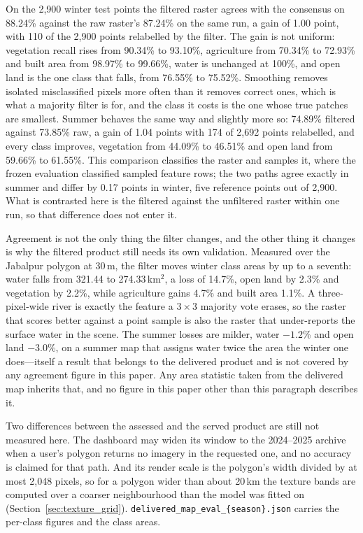 \documentclass[conference]{IEEEtran}
\begin{document}
On the 2{,}900 winter test points the filtered raster agrees with the consensus on 88.24\% against the raw raster's 87.24\% on the same run, a gain of 1.00 point, with 110 of the 2{,}900 points relabelled by the filter. The gain is not uniform: vegetation recall rises from 90.34\% to 93.10\%, agriculture from 70.34\% to 72.93\% and built area from 98.97\% to 99.66\%, water is unchanged at 100\%, and open land is the one class that falls, from 76.55\% to 75.52\%. Smoothing removes isolated misclassified pixels more often than it removes correct ones, which is what a majority filter is for, and the class it costs is the one whose true patches are smallest. Summer behaves the same way and slightly more so: 74.89\% filtered against 73.85\% raw, a gain of 1.04 points with 174 of 2{,}692 points relabelled, and every class improves, vegetation from 44.09\% to 46.51\% and open land from 59.66\% to 61.55\%. This comparison classifies the raster and samples it, where the frozen evaluation classified sampled feature rows; the two paths agree exactly in summer and differ by 0.17 points in winter, five reference points out of 2{,}900. What is contrasted here is the filtered against the unfiltered raster within one run, so that difference does not enter it.

Agreement is not the only thing the filter changes, and the other thing it changes is why the filtered product still needs its own validation. Measured over the Jabalpur polygon at 30\,m, the filter moves winter class areas by up to a seventh: water falls from 321.44 to 274.33\,km$^2$, a loss of 14.7\%, open land by 2.3\% and vegetation by 2.2\%, while agriculture gains 4.7\% and built area 1.1\%. A three-pixel-wide river is exactly the feature a $3\times3$ majority vote erases, so the raster that scores better against a point sample is also the raster that under-reports the surface water in the scene. The summer losses are milder, water $-1.2$\% and open land $-3.0$\%, on a summer map that assigns water twice the area the winter one does---itself a result that belongs to the delivered product and is not covered by any agreement figure in this paper. Any area statistic taken from the delivered map inherits that, and no figure in this paper other than this paragraph describes it.

Two differences between the assessed and the served product are still not measured here. The dashboard may widen its window to the 2024--2025 archive when a user's polygon returns no imagery in the requested one, and no accuracy is claimed for that path. And its render scale is the polygon's width divided by at most 2{,}048 pixels, so for a polygon wider than about 20\,km the texture bands are computed over a coarser neighbourhood than the model was fitted on (Section~\ref{sec:texture_grid}). \texttt{delivered\_map\_eval\_\{season\}.json} carries the per-class figures and the class areas.
\end{document}

